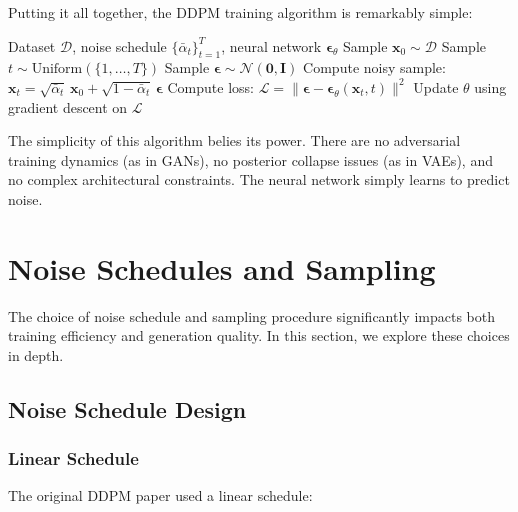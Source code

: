 Putting it all together, the DDPM training algorithm is remarkably simple:

\begin{algorithm}[H]
\caption{DDPM Training}
\label{alg:ddpm_training}
\begin{algorithmic}[1]
\REQUIRE Dataset $\mathcal{D}$, noise schedule $\{\bar{\alpha}_t\}_{t=1}^T$, neural network $\boldsymbol{\epsilon}_\theta$
\REPEAT
    \STATE Sample $\mathbf{x}_0 \sim \mathcal{D}$
    \STATE Sample $t \sim \text{Uniform}(\{1, \ldots, T\})$
    \STATE Sample $\boldsymbol{\epsilon} \sim \mathcal{N}(\mathbf{0}, \mathbf{I})$
    \STATE Compute noisy sample: $\mathbf{x}_t = \sqrt{\bar{\alpha}_t}\,\mathbf{x}_0 + \sqrt{1-\bar{\alpha}_t}\,\boldsymbol{\epsilon}$
    \STATE Compute loss: $\mathcal{L} = \|\boldsymbol{\epsilon} - \boldsymbol{\epsilon}_\theta(\mathbf{x}_t, t)\|^2$
    \STATE Update $\theta$ using gradient descent on $\mathcal{L}$
\end{algorithmic}
\end{algorithm}

The simplicity of this algorithm belies its power. There are no adversarial training dynamics (as in GANs), no posterior collapse issues (as in VAEs), and no complex architectural constraints. The neural network simply learns to predict noise.

\section{Noise Schedules and Sampling}
\label{sec:noise_schedules_sampling}

The choice of noise schedule and sampling procedure significantly impacts both training efficiency and generation quality. In this section, we explore these choices in depth.

\subsection{Noise Schedule Design}
\label{subsec:noise_schedule_design}

\subsubsection{Linear Schedule}

The original DDPM paper used a linear schedule:


